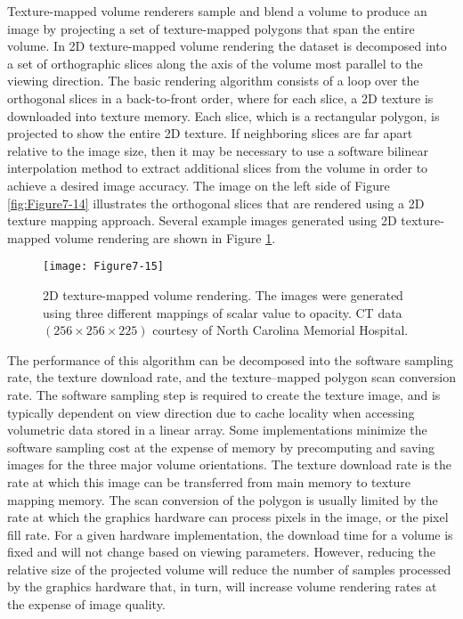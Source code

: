 Texture-mapped volume renderers sample and blend a volume to produce an image by projecting a set of texture-mapped polygons that span the entire volume. In 2D texture-mapped volume rendering the dataset is decomposed into a set of orthographic slices along the axis of the volume most parallel to the viewing direction. The basic rendering algorithm consists of a loop over the orthogonal slices in a back-to-front order, where for each slice, a 2D texture is downloaded into texture memory. Each slice, which is a rectangular polygon, is projected to show the entire 2D texture. If neighboring slices are far apart relative to the image size, then it may be necessary to use a software bilinear interpolation method to extract additional slices from the volume in order to achieve a desired image accuracy. The image on the left side of Figure \ref{fig:Figure7-14} illustrates the orthogonal slices that are rendered using a 2D texture mapping approach. Several example images generated using 2D texture-mapped volume rendering are shown in Figure \ref{fig:Figure7-15}.

\begin{figure}[!htb]
	\texttt{[image: Figure7-15]}
	\caption{2D texture-mapped volume rendering. The images were generated using three different mappings of scalar value to opacity. CT data $(256 \times 256 \times 225)$ courtesy of North Carolina Memorial Hospital.}\label{fig:Figure7-15}
\end{figure}

The performance of this algorithm can be decomposed into the software sampling rate, the texture download rate, and the texture--mapped polygon scan conversion rate. The software sampling step is required to create the texture image, and is typically dependent on view direction due to cache locality when accessing volumetric data stored in a linear array. Some implementations minimize the software sampling cost at the expense of memory by precomputing and saving images for the three major volume orientations. The texture download rate is the rate at which this image can be transferred from main memory to texture mapping memory. The scan conversion of the polygon is usually limited by the rate at which the graphics hardware can process pixels in the image, or the pixel fill rate. For a given hardware implementation, the download time for a volume is fixed and will not change based on viewing parameters. However, reducing the relative size of the projected volume will reduce the number of samples processed by the graphics hardware that, in turn, will increase volume rendering rates at the expense of image quality.

